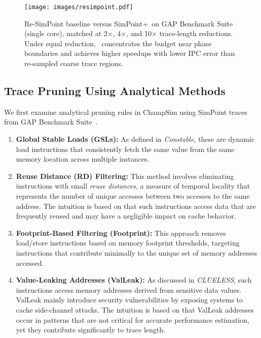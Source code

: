 \begin{figure}[!htbp]
    \centering
    \setlength{\belowcaptionskip}{-10pt}
    \captionsetup{skip=0pt}
    \captionsetup[subfigure]{font=footnotesize, skip=1pt}
    \texttt{[image: images/resimpoint.pdf]}
    \caption{Re-SimPoint baseline versus SimPoint+\name\ on GAP Benchmark Suite (single core), matched at 2$\times$, 4$\times$, and 10$\times$ trace-length reductions.  Under equal reduction, \name\ concentrates the budget near phase boundaries and achieves higher speedups with lower IPC error than re-sampled coarse trace regions.}
    \label{fig:benchmarks}
\end{figure}

\subsection*{Trace Pruning Using Analytical Methods}
We first examine analytical pruning rules in ChampSim using SimPoint traces from GAP Benchmark Suite~\cite{beamer2017gapbenchmarksuite}.
\begin{enumerate}[nosep, leftmargin=*]
    \item \textbf{Global Stable Loads (GSLs):} As defined in \textit{Constable}\cite{constable}, these are dynamic load instructions that consistently fetch the same value from the same memory location across multiple instances.  
    \item \textbf{Reuse Distance (RD) Filtering:} This method involves eliminating instructions with small \emph{reuse distances}, a measure of temporal locality that represents the number of unique accesses between two accesses to the same address. The intuition is based on that such instructions access  data that are frequently reused and may have a negligible impact on cache behavior.
    \item \textbf{Footprint-Based Filtering (Footprint):} This approach removes load/store instructions based on memory footprint thresholds, targeting instructions that contribute minimally to the unique set of memory addresses accessed.
    \item \textbf{Value-Leaking Addresses (ValLeak):} As discussed in \emph{CLUELESS}\cite{clueless}, such instructions access memory addresses derived from sensitive data values. ValLeak mainly introduce security vulnerabilities by exposing systems to cache side-channel attacks. { The intuition is based on that ValLeak addresses occur in patterns that are not critical for accurate performance estimation, yet they contribute significantly to trace length.}
\end{enumerate} 


